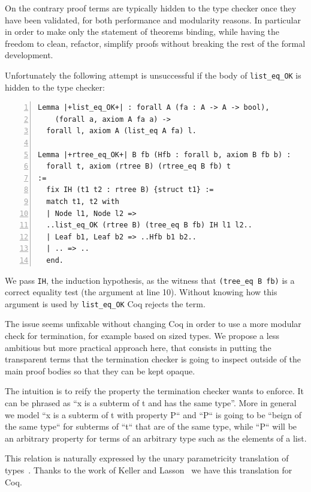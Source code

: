 \documentclass[sigplan,10pt,review]{acmart}\settopmatter{printfolios=true,printccs=false,printacmref=false}
\begin{document}
On the contrary proof terms are typically hidden to the type checker once
they have been validated, for both performance and modularity reasons.
In particular in order
to make only the statement of theorems binding, while having
the freedom to clean, refactor, simplify proofs without breaking
the rest of the formal development. 

Unfortunately the following attempt is unsuccessful if the body of
\lstinline+list_eq_OK+ is hidden to the type checker:

\begin{lstlisting}[numbers=left]
Lemma |+list_eq_OK+| : forall A (fa : A -> A -> bool),
    (forall a, axiom A fa a) ->
  forall l, axiom A (list_eq A fa) l.

Lemma |+rtree_eq_OK+| B fb (Hfb : forall b, axiom B fb b) :
  forall t, axiom (rtree B) (rtree_eq B fb) t
:= 
  fix IH (t1 t2 : rtree B) {struct t1} :=
  match t1, t2 with
  | Node l1, Node l2 =>
  ..list_eq_OK (rtree B) (tree_eq B fb) IH l1 l2..
  | Leaf b1, Leaf b2 => ..Hfb b1 b2..
  | .. => ..
  end.
\end{lstlisting}

\noindent
We pass \lstinline+IH+, the induction hypothesis, as the
witness that \lstinline+(tree_eq B fb)+ is a correct equality test
(the argument at line 10). Without knowing how this argument is used
by \lstinline+list_eq_OK+ Coq rejects the term.

The issue seems unfixable without changing Coq in order to use a more
modular check for termination, for example based on sized
types\cite{sacchini:pastel-00622429}.
We propose a less ambitious but more practical approach here, that
consists in putting the transparent terms that the termination checker
is going to inspect outside of the main proof bodies so that they can be 
kept opaque.

The intuition is to reify the property the termination checker wants
to enforce. It can be phrased as ``x is a subterm of t and has the same
type''. More in general we model ``x is a subterm of t with property
P`` and ``P`` is going to be ``beign of the same type`` for subterms
of ``t`` that are of the same type, while ``P`` will be an arbitrary
property for terms of an arbitrary type such as the elements of
a list.

This relation is naturally expressed by the unary parametricity
translation of types~\cite{Wadler:1989:TF:99370.99404}.
Thanks to the work of Keller and
Lasson~\cite{keller:hal-00730913} we have this translation for Coq.
\end{document}
